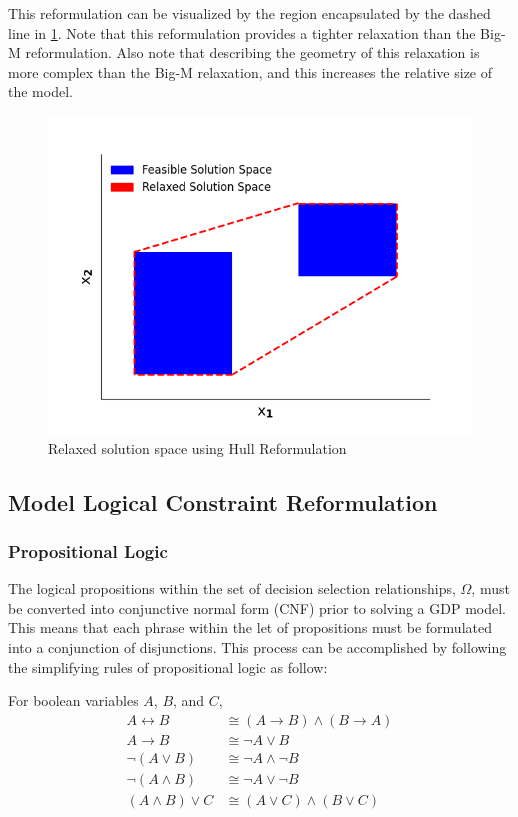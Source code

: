 \documentclass{juliacon}
\begin{document}
This reformulation can be visualized by the region encapsulated by the dashed line in \ref{fig:chr}. Note that this reformulation provides a tighter relaxation than the Big-M reformulation. Also note that describing the geometry of this relaxation is more complex than the Big-M relaxation, and this increases the relative size of the model.
\vskip 6pt
\begin{figure}[H]
    \centering
    \includegraphics[scale=0.5]{chr.png}
    \caption{Relaxed solution space using Hull Reformulation}
    \label{fig:chr}
\end{figure}
\vskip 6pt


\subsection{Model Logical Constraint Reformulation}

\subsubsection{Propositional Logic}
The logical propositions within the set of decision selection relationships, $\Omega$, must be converted into conjunctive normal form (CNF) prior to solving a GDP model. This means that each phrase within the let of propositions must be formulated into a conjunction of disjunctions. This process can be accomplished by following the simplifying rules of propositional logic as follow:
\vskip 6pt

For boolean variables $A$, $B$, and $C$,
\begin{align*}
    A \leftrightarrow B & \cong (A \rightarrow B) \land (B \rightarrow A) \\
    A \rightarrow B & \cong \lnot A \lor B \\
    \lnot(A \lor B) & \cong \lnot A \land \lnot B \\
    \lnot(A \land B) & \cong \lnot A \lor \lnot B \\
    (A \land B) \lor C & \cong (A \lor C) \land (B \lor C)
\end{align*}
\vskip 6pt
\end{document}
